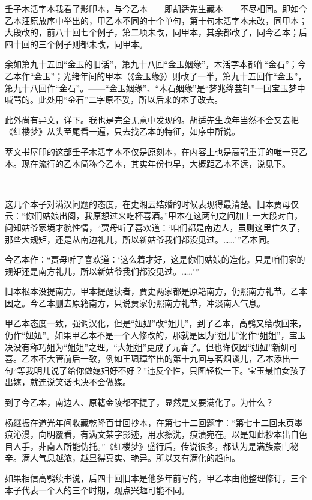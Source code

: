 \par 壬子木活字本我看了影印本，与今乙本——即胡适先生藏本——不尽相同。即如今乙本汪原放序中举出的，甲乙本不同的十个单句，第十句木活字本未改，同甲本；大段改的，前八十回七个例子，第二项未改，同甲本，其余都改了，同今乙本；后四十回的三个例子则都未改，同甲本。
\par 余如第九十五回“金玉的旧话”，第九十八回“金玉姻缘”，木活字本都作“金石”；今乙本作“金玉”；光绪年间的甲本（《金玉缘》）则改了一半，第九十五回作“金玉”，第九十八回作“金石”。——“金玉姻缘”、“木石姻缘”是“梦兆绛芸轩”一回宝玉梦中喊骂的。此处用“金石”二字原不妥，所以后来的本子改去。
\par 此外尚有异文，详下。我也是完全无意中发现的。胡适先生晚年当然不会又去把《红楼梦》从头至尾看一遍，只去找乙本的特征，如序中所说。
\par 萃文书屋印的这部壬子木活字本不仅是原刻本，在内容上也是高鹗重订的唯一真乙本。现在流行的乙本简称今乙本，其实年份也早，大概距乙本不远，说见下。
\par  
\par 这几个本子对满汉问题的态度，在史湘云结婚的时候表现得最清楚。旧本贾母仅云：“你们姑娘出阁，我原想过来吃杯喜酒。”甲本在这两句之间加上一大段对白，问知姑爷家境才貌性情，“贾母听了喜欢道：‘咱们都是南边人，虽则这里住久了，那些大规矩，还是从南边礼儿，所以新姑爷我们都没见过。……'”乙本同。
\par 今乙本作：“贾母听了喜欢道：‘这么着才好，这是你们姑娘的造化。只是咱们家的规矩还是南方礼儿，所以新姑爷我们都没见过。……'”
\par 旧本根本没提南方。甲本提醒读者，贾史两家都是原籍南方，仍照南方礼节。乙本因之。今乙本删去原籍南方，只说贾家仍照南方礼节，冲淡南人气息。
\par 甲乙本态度一致，强调汉化，但是“妞妞”改“姐儿”，到了乙本，高鹗又给改回来，仍作“妞妞”。如果甲乙本不是一个人修改的，那就是因为“姐儿”讹作“姐姐”，宝玉决没有称巧姐为“姐姐”之理。“大姐姐”更成了元春了。但也许仅因“妞妞”新妍可喜。乙本不大管前后一致，例如王珮璋举出的第十九回与茗烟谈儿，乙本添出一句“等我明儿说了给你做媳妇好不好？”违反个性，只图轻松一下。宝玉最怕女孩子出嫁，就连说笑话也决不会做媒。
\par 到了今乙本，南边人、原籍金陵都不提了，显然是又要满化了。为什么？
\par 杨继振在道光年间收藏乾隆百廿回抄本，在第七十二回题字：“第七十二回末页墨痕沁漫，向明覆看，有满文某字影迹，用水擦洗，痕渍宛在。以是知此抄本出自色目人手，非南人所能伪托。”《红楼梦》盛行后，传说很多，都认为是满族豪门秘辛。满人气息越浓，越显得真实、艳异。所以又有满化的趋向。
\par 如果相信高鹗续书说，后四十回旧本是他多年前写的，甲乙本由他整理修订，三个本子代表一个人的三个时期，观点兴趣可能不同。
